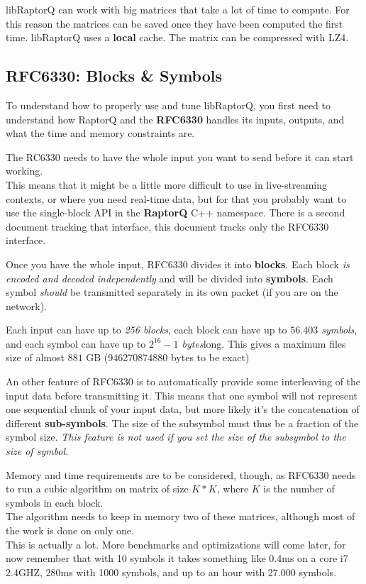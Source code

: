 \documentclass[11pt,a4paper]{refart}
\begin{document}
 libRaptorQ can work with big matrices that take a lot of time to compute. For this reason the matrices can be saved once they have
been computed the first time. libRaptorQ uses a \textbf{local} cache. The matrix can be compressed with LZ4.

\subsection{RFC6330: Blocks \& Symbols}

To understand how to properly use and tune libRaptorQ, you first need to understand how RaptorQ and the \textbf{RFC6330} handles its inputs, outputs, and what the time and memory
constraints are.

The RC6330 needs to have the whole input you want to send before it can start working.\\
This means that it might be a little more difficult to use in live-streaming contexts, or where you need real-time data, but for that you probably want to use the single-block API in the \textbf{RaptorQ} C++ namespace. There is a second document tracking that interface, this document tracks only the RFC6330 interface.

Once you have the whole input, RFC6330 divides it into \textbf{blocks}. Each block \textit{is encoded and decoded independently} and will be divided into \textbf{symbols}. Each symbol \textit{should}
be transmitted separately in its own packet (if you are on the network).

Each input can have up to \textit{256 blocks}, each block can have up to \textit{$56.403$ symbols}, and each
symbol can have up to \textit{$2^{16}-1$ bytes}long. This gives a maximum files size of almost $881$ GB (946270874880 bytes to be exact)

An other feature of RFC6330 is to automatically provide some interleaving of the input data before transmitting it. This means that one symbol will not
represent one sequential chunk of your input data, but more likely it's the concatenation of different \textbf{sub-symbols}. The size of the subsymbol must thus
be a fraction of the symbol size. \textit{This feature is not used if you set the size of the subsymbol to the size of symbol}.


Memory and time requirements are to be considered, though, as RFC6330 needs to run a cubic algorithm on matrix of size $K*K$, where $K$ is the number of
symbols in each block.\\
The algorithm needs to keep in memory two of these matrices, although most of the work is done on only one.\\
This is actually a lot. More benchmarks and optimizations will come later, for now remember that with 10 symbols it takes something like 0.4ms on a core i7 2.4GHZ, 280ms with 1000 symbols, and up to an hour with 27.000 symbols.
\end{document}
